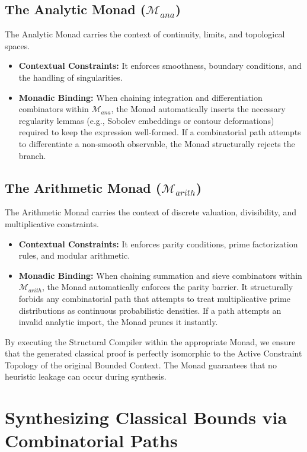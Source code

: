 \documentclass[12pt,openany]{extbook}
\theoremstyle{plain}
\theoremstyle{definition}
\begin{document}
\subsection{The Analytic Monad ($\mathcal{M}_{ana}$)}
The Analytic Monad carries the context of continuity, limits, and topological spaces. 
\begin{itemize}
    \item \textbf{Contextual Constraints:} It enforces smoothness, boundary conditions, and the handling of singularities. 
    \item \textbf{Monadic Binding:} When chaining integration and differentiation combinators within $\mathcal{M}_{ana}$, the Monad automatically inserts the necessary regularity lemmas (e.g., Sobolev embeddings or contour deformations) required to keep the expression well-formed. If a combinatorial path attempts to differentiate a non-smooth observable, the Monad structurally rejects the branch.
\end{itemize}

\subsection{The Arithmetic Monad ($\mathcal{M}_{arith}$)}
The Arithmetic Monad carries the context of discrete valuation, divisibility, and multiplicative constraints.
\begin{itemize}
    \item \textbf{Contextual Constraints:} It enforces parity conditions, prime factorization rules, and modular arithmetic.
    \item \textbf{Monadic Binding:} When chaining summation and sieve combinators within $\mathcal{M}_{arith}$, the Monad automatically enforces the parity barrier. It structurally forbids any combinatorial path that attempts to treat multiplicative prime distributions as continuous probabilistic densities. If a path attempts an invalid analytic import, the Monad prunes it instantly.
\end{itemize}

By executing the Structural Compiler within the appropriate Monad, we ensure that the generated classical proof is perfectly isomorphic to the Active Constraint Topology of the original Bounded Context. The Monad guarantees that no heuristic leakage can occur during synthesis.

\section{Synthesizing Classical Bounds via Combinatorial Paths}
\end{document}

